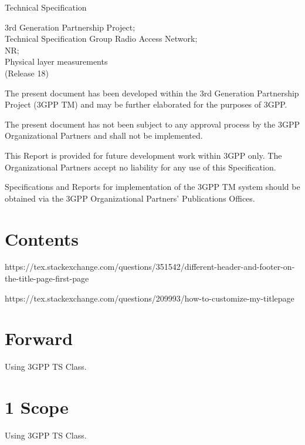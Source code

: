 \documentclass{3GPPspec}
\begin{document}
\pagestyle{fancy}
\fancyhead[C]{\textsf{\thepage}}
\renewcommand{\headrulewidth}{0.4pt}



\thispagestyle{firstpage}

\begin{flushright}
	\textsf{Technical Specification}
\end{flushright}


\begin{flushright}
	\textsf{
		3rd Generation Partnership Project;\\
		Technical Specification Group Radio Access Network;\\
		NR;\\
		Physical layer measurements\\
		(Release 18)
	}
\end{flushright}


The present document has been developed within the 3rd Generation Partnership Project (3GPP TM) and may be further elaborated for the purposes of 3GPP.

The present document has not been subject to any approval process by the 3GPP Organizational Partners and shall not be implemented.

This Report is provided for future development work within 3GPP only. The Organizational Partners accept no liability for any use of this Specification.

Specifications and Reports for implementation of the 3GPP TM system should be obtained via the 3GPP Organizational Partners' Publications Offices.

\newpage



\section*{\textsf{Contents}}
\tableofcontents

https://tex.stackexchange.com/questions/351542/different-header-and-footer-on-the-title-page-first-page

https://tex.stackexchange.com/questions/209993/how-to-customize-my-titlepage

\section*{\textsf{Forward}}
Using 3GPP TS Class.


\newpage
\section{\textsf{1 \quad Scope}}
Using 3GPP TS Class.
\end{document}

